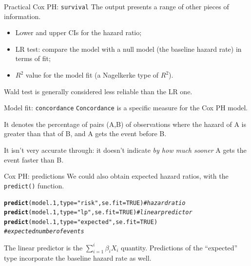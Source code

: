 \documentclass[12pt,english,pdf,xcolor=dvipsnames,aspectratio=169,handout]{beamer}\usepackage[]{graphicx}\usepackage[]{xcolor}
\makeatletter
\newcommand{\hlnum}[1]{\textcolor[rgb]{0.686,0.059,0.569}{#1}}%
\newcommand{\hlstr}[1]{\textcolor[rgb]{0.192,0.494,0.8}{#1}}%
\newcommand{\hlcom}[1]{\textcolor[rgb]{0.678,0.584,0.686}{\textit{#1}}}%
\newcommand{\hlstd}[1]{\textcolor[rgb]{0.345,0.345,0.345}{#1}}%
\newcommand{\hlkwc}[1]{\textcolor[rgb]{0.333,0.667,0.333}{#1}}%
\newcommand{\hlkwd}[1]{\textcolor[rgb]{0.737,0.353,0.396}{\textbf{#1}}}%
\newenvironment{kframe}{%
 \def\at@end@of@kframe{}%
 \ifinner\ifhmode%
  \def\at@end@of@kframe{\end{minipage}}%
  \begin{minipage}{\columnwidth}%
 \fi\fi%
 \def\FrameCommand##1{\hskip\@totalleftmargin \hskip-\fboxsep
 \colorbox{shadecolor}{##1}\hskip-\fboxsep
     \hskip-\linewidth \hskip-\@totalleftmargin \hskip\columnwidth}%
 \MakeFramed {\advance\hsize-\width
   \@totalleftmargin\z@ \linewidth\hsize
   \@setminipage}}%
 {\par\unskip\endMakeFramed%
 \at@end@of@kframe}
\newenvironment{knitrout}{}{} %
\makeatother
\begin{document}
\begin{frame}{Practical Cox PH: \texttt{survival}}
The output presents a range of other pieces of information.\bigskip

\begin{itemize}
\item Lower and upper CIs for the hazard ratio;
\item LR test: compare the model with a null model (the baseline hazard rate) in terms of fit;
\item $R^2$ value for the model fit (a Nagelkerke type of $R^2$).
\end{itemize}
\bigskip
Wald test is generally considered less reliable than the LR one.
\end{frame}



\begin{frame}{Model fit: \texttt{concordance}}
\texttt{Concordance} is a specific measure for the Cox PH model.\bigskip

It denotes the percentage of pairs (A,B) of observations where the hazard of A is greater than that of B, and A gets the event before B.\bigskip

It isn't very accurate through: it doesn't indicate \textit{by how much sooner} A gets the event faster than B.
\end{frame}



\begin{frame}[fragile]{Cox PH: predictions}
We could also obtain expected hazard ratios, with the \texttt{predict()} function.\bigskip

\begin{knitrout}\scriptsize
{}\color{fgcolor}\begin{kframe}
\begin{alltt}
\hlkwd{predict}\hlstd{(model.1,} \hlkwc{type} \hlstd{=} \hlstr{"risk"}\hlstd{,} \hlkwc{se.fit} \hlstd{=} \hlnum{TRUE}\hlstd{)} \hlcom{# hazard ratio}
\hlkwd{predict}\hlstd{(model.1,} \hlkwc{type} \hlstd{=} \hlstr{"lp"}\hlstd{,} \hlkwc{se.fit} \hlstd{=} \hlnum{TRUE}\hlstd{)} \hlcom{# linear predictor}
\hlkwd{predict}\hlstd{(model.1,} \hlkwc{type} \hlstd{=} \hlstr{"expected"}\hlstd{,} \hlkwc{se.fit} \hlstd{=} \hlnum{TRUE}\hlstd{)}
\hlcom{# expected number of events}
\end{alltt}
\end{kframe}
\end{knitrout}

The linear predictor is the $\sum\limits_{i=1}^{i}\beta_{i}X_{i}$ quantity. Predictions of the ``expected'' type incorporate the baseline hazard rate as well.
\end{frame}
\end{document}
